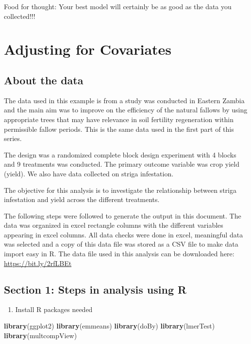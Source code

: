 \documentclass[]{book}
\newenvironment{Shaded}{\begin{snugshade}}{\end{snugshade}}
\newcommand{\KeywordTok}[1]{\textcolor[rgb]{0.13,0.29,0.53}{\textbf{#1}}}
\newcommand{\NormalTok}[1]{#1}
\providecommand{\tightlist}{%
  \setlength{\itemsep}{0pt}\setlength{\parskip}{0pt}}
\theoremstyle{definition}
\theoremstyle{definition}
\theoremstyle{definition}
\theoremstyle{remark}
\begin{document}
Food for thought: Your best model will certainly be as good as the data
you collected!!!

\chapter{Adjusting for Covariates}\label{adjusting-for-covariates}

\section{About the data}\label{about-the-data-2}

The data used in this example is from a study was conducted in Eastern
Zambia and the main aim was to improve on the efficiency of the natural
fallows by using appropriate trees that may have relevance in soil
fertility regeneration within permissible fallow periods. This is the
same data used in the first part of this series.

The design was a randomized complete block design experiment with 4
blocks and 9 treatments was conducted. The primary outcome variable was
crop yield (yield). We also have data collected on striga infestation.

The objective for this analysis is to investigate the relationship
between striga infestation and yield across the different treatments.

The following steps were followed to generate the output in this
document. The data was organized in excel rectangle columns with the
different variables appearing in excel columns. All data checks were
done in excel, meaningful data was selected and a copy of this data file
was stored as a CSV file to make data import easy in R. The data file
used in this analysis can be downloaded here:
\url{https://bit.ly/2rfLBEt}

\section{Section 1: Steps in analysis using
R}\label{section-1-steps-in-analysis-using-r-2}

\begin{enumerate}
\def\labelenumi{\arabic{enumi}.}
\tightlist
\item
  Install R packages needed
\end{enumerate}

\begin{Shaded}
\begin{Highlighting}[]
\KeywordTok{library}\NormalTok{(ggplot2)}
\KeywordTok{library}\NormalTok{(emmeans)}
\KeywordTok{library}\NormalTok{(doBy)}
\KeywordTok{library}\NormalTok{(lmerTest)}
\KeywordTok{library}\NormalTok{(multcompView)}
\end{Highlighting}
\end{Shaded}
\end{document}
